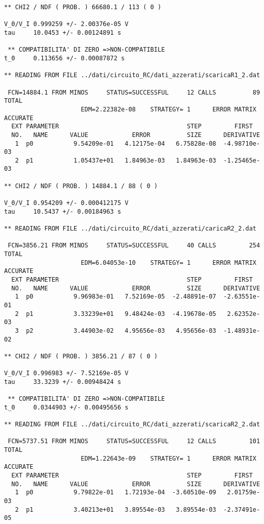 \begin{verbatim}
** CHI2 / NDF ( PROB. ) 66680.1 / 113 ( 0 )

V_0/V_I 0.999259 +/- 2.00376e-05 V
tau     10.0453 +/- 0.00124891 s

 ** COMPATIBILITA' DI ZERO =>NON-COMPATIBILE
t_0     0.113656 +/- 0.00087872 s

** READING FROM FILE ../dati/circuito_RC/dati_azzerati/scaricaR1_2.dat

 FCN=14884.1 FROM MINOS     STATUS=SUCCESSFUL     12 CALLS          89 TOTAL
                     EDM=2.22382e-08    STRATEGY= 1      ERROR MATRIX ACCURATE 
  EXT PARAMETER                                   STEP         FIRST   
  NO.   NAME      VALUE            ERROR          SIZE      DERIVATIVE 
   1  p0           9.54209e-01   4.12175e-04   6.75828e-08  -4.98710e-03
   2  p1           1.05437e+01   1.84963e-03   1.84963e-03  -1.25465e-03

** CHI2 / NDF ( PROB. ) 14884.1 / 88 ( 0 )

V_0/V_I 0.954209 +/- 0.000412175 V
tau     10.5437 +/- 0.00184963 s

** READING FROM FILE ../dati/circuito_RC/dati_azzerati/caricaR2_2.dat

 FCN=3856.21 FROM MINOS     STATUS=SUCCESSFUL     40 CALLS         254 TOTAL
                     EDM=6.04053e-10    STRATEGY= 1      ERROR MATRIX ACCURATE 
  EXT PARAMETER                                   STEP         FIRST   
  NO.   NAME      VALUE            ERROR          SIZE      DERIVATIVE 
   1  p0           9.96983e-01   7.52169e-05  -2.48891e-07  -2.63551e-01
   2  p1           3.33239e+01   9.48424e-03  -4.19678e-05   2.62352e-03
   3  p2           3.44903e-02   4.95656e-03   4.95656e-03  -1.48931e-02

** CHI2 / NDF ( PROB. ) 3856.21 / 87 ( 0 )

V_0/V_I 0.996983 +/- 7.52169e-05 V
tau     33.3239 +/- 0.00948424 s

 ** COMPATIBILITA' DI ZERO =>NON-COMPATIBILE
t_0     0.0344903 +/- 0.00495656 s

** READING FROM FILE ../dati/circuito_RC/dati_azzerati/scaricaR2_2.dat

 FCN=5737.51 FROM MINOS     STATUS=SUCCESSFUL     12 CALLS         101 TOTAL
                     EDM=1.22643e-09    STRATEGY= 1      ERROR MATRIX ACCURATE 
  EXT PARAMETER                                   STEP         FIRST   
  NO.   NAME      VALUE            ERROR          SIZE      DERIVATIVE 
   1  p0           9.79822e-01   1.72193e-04  -3.60510e-09   2.01759e-03
   2  p1           3.40213e+01   3.89554e-03   3.89554e-03  -2.37491e-05


\end{verbatim}
